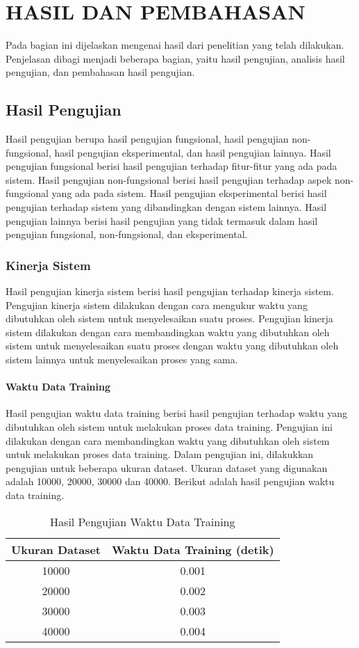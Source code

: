 \chapter{HASIL DAN PEMBAHASAN}
Pada bagian ini dijelaskan mengenai hasil dari penelitian yang telah dilakukan. Penjelasan dibagi menjadi beberapa bagian, yaitu hasil pengujian, analisis hasil pengujian, dan pembahasan hasil pengujian.

\section{Hasil Pengujian}
Hasil pengujian berupa hasil pengujian fungsional, hasil pengujian non-fungsional, hasil pengujian eksperimental, dan hasil pengujian lainnya. Hasil pengujian fungsional berisi hasil pengujian terhadap fitur-fitur yang ada pada sistem. Hasil pengujian non-fungsional berisi hasil pengujian terhadap aspek non-fungsional yang ada pada sistem. Hasil pengujian eksperimental berisi hasil pengujian terhadap sistem yang dibandingkan dengan sistem lainnya. Hasil pengujian lainnya berisi hasil pengujian yang tidak termasuk dalam hasil pengujian fungsional, non-fungsional, dan eksperimental.

\subsection{Kinerja Sistem}
Hasil pengujian kinerja sistem berisi hasil pengujian terhadap kinerja sistem. Pengujian kinerja sistem dilakukan dengan cara mengukur waktu yang dibutuhkan oleh sistem untuk menyelesaikan suatu proses. Pengujian kinerja sistem dilakukan dengan cara membandingkan waktu yang dibutuhkan oleh sistem untuk menyelesaikan suatu proses dengan waktu yang dibutuhkan oleh sistem lainnya untuk menyelesaikan proses yang sama.

\subsubsection{Waktu Data Training}
Hasil pengujian waktu data training berisi hasil pengujian terhadap waktu yang dibutuhkan oleh sistem untuk melakukan proses data training. Pengujian ini dilakukan dengan cara membandingkan waktu yang dibutuhkan oleh sistem untuk melakukan proses data training.
Dalam pengujian ini, dilakukkan pengujian untuk beberapa ukuran dataset. Ukuran dataset yang digunakan adalah 10000, 20000, 30000 dan 40000. 
Berikut adalah hasil pengujian waktu data training.

\begin{table}[h]
    \centering
    \begin{tabular}{|c|c|}
    \hline
    \textbf{Ukuran Dataset} & \textbf{Waktu Data Training (detik)} \\
    \hline
    10000 & 0.001 \\
    \hline
    20000 & 0.002 \\
    \hline
    30000 & 0.003 \\
    \hline
    40000 & 0.004 \\
    \hline
    \end{tabular}
    \caption{Hasil Pengujian Waktu Data Training}
    \label{table:1}
\end{table}


